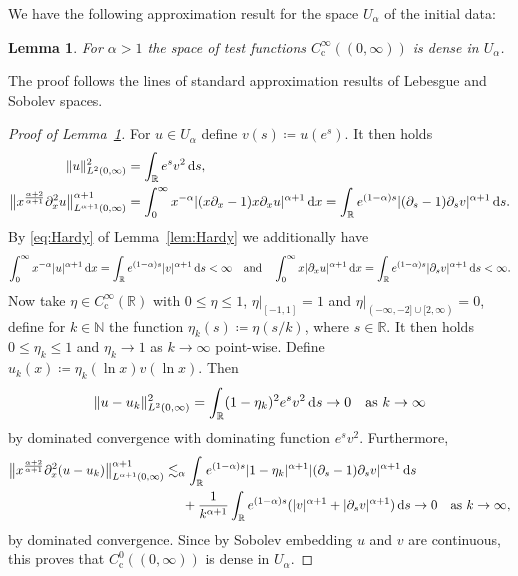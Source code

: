 \documentclass[reqno,12pt]{amsart}
\renewcommand{\d}{\ensuremath{\mathrm{d}}}
\newcommand{\R}{\ensuremath{\mathbb{R}}}
\newcommand{\N}{\ensuremath{\mathbb{N}}}
\renewcommand{\d}{\ensuremath{{\rm d}}}
\newtheorem{lemma}[theorem]{Lemma}
\numberwithin{equation}{section}
\begin{document}
We have the following approximation result for the space $U_\alpha$ of the initial data:
%
\begin{lemma}\label{lem-approx-ualpha}
For $\alpha > 1$ the space of test functions $C_\mathrm{c}^\infty((0,\infty))$ is dense in $U_\alpha$.
\end{lemma}
%

The proof follows the lines of standard approximation results of Lebesgue and Sobolev spaces.
%
\begin{proof}[Proof of Lemma~\ref{lem-approx-ualpha}]
For $u \in U_\alpha$ define $v(s) \coloneq u(e^s)$. It then holds
%
\begin{align*}
\|u\|_{L^2(0,\infty)}^2 &= \int_\R e^s v^2 \, \d s, \\
\big\|x^{\frac{\alpha+2}{\alpha+1}} \partial_x^2 u\big\|_{L^{\alpha+1}(0,\infty)}^{\alpha+1} &= \int_0^\infty x^{-\alpha} |(x \partial_x - 1) x \partial_x u|^{\alpha+1} \, \d x = \int_\R e^{(1-\alpha) s} |(\partial_s - 1) \partial_s v|^{\alpha+1} \, \d s.
\end{align*}
%
By \eqref{eq:Hardy} of Lemma~\ref{lem:Hardy} we additionally have
%
\[
\int_0^\infty x^{-\alpha} |u|^{\alpha+1} \, \d x = \int_\R e^{(1-\alpha)s} |v|^{\alpha+1} \, \d s < \infty \quad \text{and} \quad \int_0^\infty x |\partial_x u|^{\alpha+1} \, \d x = \int_\R e^{(1-\alpha)s} |\partial_s v|^{\alpha+1} \, \d s < \infty.
\]
%
Now take $\eta \in C^\infty_\mathrm{c}(\R)$ with $0 \le \eta \le 1$, $\eta|_{[-1,1]} = 1$ and $\eta|_{(-\infty,-2] \cup [2,\infty)} = 0$, define for $k \in \N$ the function $\eta_k(s) \coloneq \eta(s/k)$, where $s \in \R$. It then holds $0 \le \eta_k \le 1$ and $\eta_k \to 1$ as $k \to \infty$ point-wise. Define $u_k(x) \coloneq \eta_k(\ln x) v(\ln x)$. Then
%
\[
\|u-u_k\|_{L^2(0,\infty)}^2 = \int_\R (1-\eta_k)^2 e^s v^2 \, \d s \to 0 \quad \text{as } k \to \infty
\]
%
by dominated convergence with dominating function $e^s v^2$. Furthermore,
%
\begin{align*}
\big\|x^{\frac{\alpha+2}{\alpha+1}} \partial_x^2 (u-u_k)\big\|_{L^{\alpha+1}(0,\infty)}^{\alpha+1} &\lesssim_\alpha \int_\R e^{(1-\alpha) s} |1-\eta_k|^{\alpha+1} |(\partial_s - 1) \partial_s v|^{\alpha+1} \, \d s \\
&\phantom{\lesssim_\alpha} + \frac{1}{k^{\alpha+1}} \int_\R e^{(1-\alpha)s} (|v|^{\alpha+1} + |\partial_s v|^{\alpha+1}) \, \d s \to 0 \quad \text{as } k \to \infty,
\end{align*}
%
by dominated convergence. Since by Sobolev embedding $u$ and $v$ are continuous, this proves that $C^0_\mathrm{c}((0,\infty))$ is dense in $U_\alpha$.


\end{proof}
\end{document}
